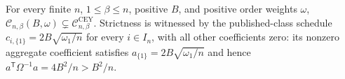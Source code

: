 For every finite \(n\), \(1\le\beta\le n\), positive \(B\), and positive order weights \(\omega\), \(\mathcal C_{n,\beta}(B,\omega)\subsetneq\mathcal C^{\mathrm{CEY}}_{n,\beta}\). Strictness is witnessed by the published-class schedule \(c_{i,\{1\}}=2B\sqrt{\omega_1/n}\) for every \(i\in I_n\), with all other coefficients zero: its nonzero aggregate coefficient satisfies \(a_{\{1\}}=2B\sqrt{\omega_1/n}\) and hence \(a^{\mathsf T}\Omega^{-1}a=4B^2/n>B^2/n\).